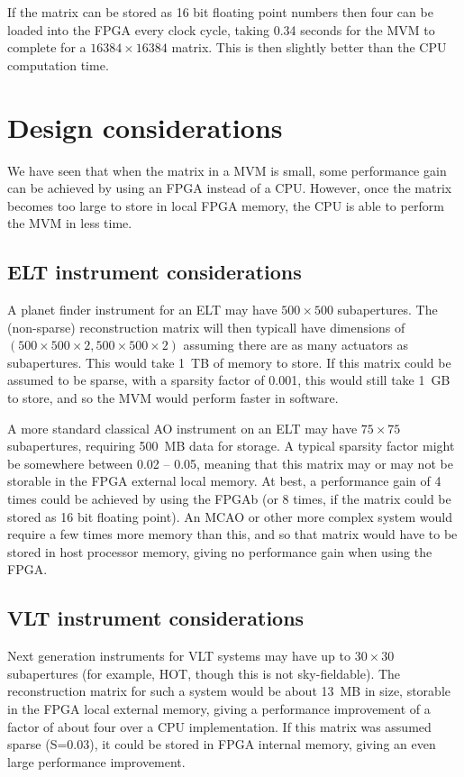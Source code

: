 \documentclass{article}
\begin{document}
If the matrix can be stored as 16 bit floating point numbers then four
can be loaded into the FPGA every clock cycle, taking 0.34 seconds for
the MVM to complete for a $16384\times 16384$ matrix.  This is then
slightly better than the CPU computation time.  

\section{Design considerations}
We have seen that when the matrix in a MVM is small, some performance
gain can be achieved by using an FPGA instead of a CPU.  However, once
the matrix becomes too large to store in local FPGA memory, the CPU is
able to perform the MVM in less time.  

\subsection{ELT instrument considerations}
A planet finder instrument for an ELT may have $500\times500$
subapertures.  The (non-sparse) reconstruction matrix will then
typicall have dimensions of $(500\times500\times2,
500\times500\times2)$ assuming there are as many actuators as
subapertures.  This would take 1~TB of memory to store.  If this
matrix could be assumed to be sparse, with a sparsity factor of 0.001,
this would still take 1~GB to store, and so the MVM would perform
faster in software.  

A more standard classical AO instrument on an ELT may have
$75\times75$ subapertures, requiring 500~MB data for storage.  A
typical sparsity factor might be somewhere between 0.02 -- 0.05,
meaning that this matrix may or may not be storable in the FPGA
external local memory.  At best, a performance gain of 4 times could
be achieved by using the FPGAb (or 8 times, if the matrix could be
stored as 16 bit floating point).  An MCAO or other more complex system
would require a few times more memory than this, and so that matrix
would have to be stored in host processor memory, giving no
performance gain when using the FPGA.

\subsection{VLT instrument considerations}
Next generation instruments for VLT systems may have up to
$30\times30$ subapertures (for example, HOT, though this is not
sky-fieldable).  The reconstruction matrix for such a system would be
about 13~MB in size, storable in the FPGA local external memory,
giving a performance improvement of a factor of about four over a CPU
implementation.  If this matrix was assumed sparse (S=0.03), it
could be stored in FPGA internal memory, giving an even large
performance improvement.  
\end{document}
